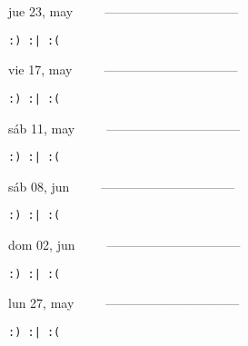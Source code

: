 \documentclass[letterpaper,10pt]{article}
\begin{document}
\begin{multicols}{3}
{jue 23, may\ \ \ \ \ --------------------------------}
\begin{flushright}\begin{small}\texttt{:) :| :(}\end{small}\end{flushright}
\vfill
{vie 17, may\ \ \ \ \ --------------------------------}
\begin{flushright}\begin{small}\texttt{:) :| :(}\end{small}\end{flushright}\par
\vfill
{sáb 11, may\ \ \ \ \ --------------------------------}
\begin{flushright}\begin{small}\texttt{:) :| :(}\end{small}\end{flushright}\par
\vfill
\end{multicols}
\vspace{1.05cm}

\begin{multicols}{3}
{sáb 08, jun\ \ \ \ \ --------------------------------}
\begin{flushright}\begin{small}\texttt{:) :| :(}\end{small}\end{flushright}
\vfill
{dom 02, jun\ \ \ \ \ --------------------------------}
\begin{flushright}\begin{small}\texttt{:) :| :(}\end{small}\end{flushright}\par
\vfill
{lun 27, may\ \ \ \ \ --------------------------------}
\begin{flushright}\begin{small}\texttt{:) :| :(}\end{small}\end{flushright}\par
\vfill
\end{multicols}
\vspace{1.05cm}
\end{document}
